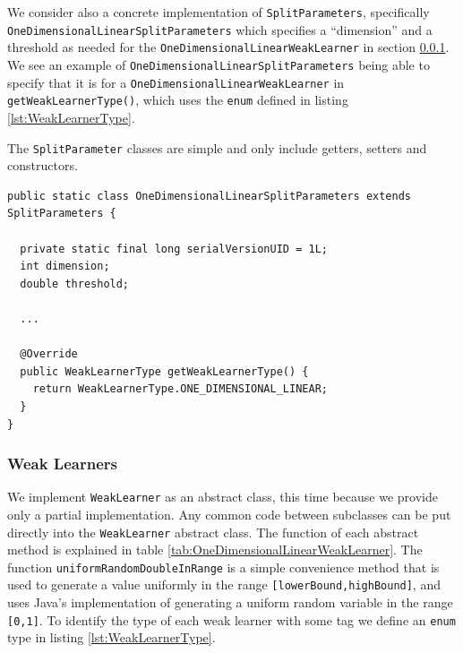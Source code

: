 \documentclass[12pt,twoside,notitlepage]{report}
\begin{document}
                We consider also a concrete implementation of \texttt{SplitParameters}, specifically 
                \texttt{OneDimensionalLinearSplitParameters} which specifies a ``dimension'' and a threshold as needed 
                for the \texttt{OneDimensionalLinearWeakLearner} in section \ref{sec:weak_learner}. We see an example of 
                \texttt{OneDimensionalLinearSplitParameters} being able to specify that it is for a 
                \texttt{OneDimensionalLinearWeakLearner} in \texttt{getWeakLearnerType()}, which uses the \texttt{enum} defined 
                in listing \ref{lst:WeakLearnerType}. 

                The \texttt{SplitParameter} classes are simple and only include getters, setters and constructors.

                \begin{lstlisting}[caption={Example of a concrete subclass of \texttt{SplitParameters}.}]
public static class OneDimensionalLinearSplitParameters extends SplitParameters {
  
  private static final long serialVersionUID = 1L;
  int dimension;
  double threshold;

  ...

  @Override
  public WeakLearnerType getWeakLearnerType() {
    return WeakLearnerType.ONE_DIMENSIONAL_LINEAR;
  } 
}
                \end{lstlisting}


            \subsubsection{Weak Learners} \label{sec:weak_learner}
                We implement \texttt{WeakLearner} as an abstract class, this time because we provide only a partial 
                implementation. Any common code between subclasses can be put directly into the \texttt{WeakLearner} 
                abstract class. The function of each abstract method is explained in table 
                \ref{tab:OneDimensionalLinearWeakLearner}. The function \texttt{uniformRandomDoubleInRange} is a simple 
                convenience method that is used to generate a value uniformly in the range \texttt{[lowerBound,highBound]}, 
                and uses Java's implementation of generating a uniform random variable in the range \texttt{[0,1]}. To 
                identify the type of each weak learner with some tag we define an \texttt{enum} type in listing 
                \ref{lst:WeakLearnerType}. 
\end{document}

